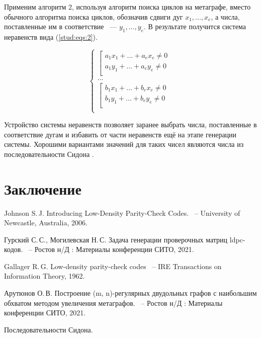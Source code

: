 \documentclass[14pt]{mmcs_article}
\begin{document}
Применим алгоритм 2, используя алгоритм поиска циклов на метаграфе, вместо обычного алгоритма поиска циклов, обозначив сдвиги дуг $x_1, ..., x_e$, а числа, поставленные им в соответствие ~--- $y_1, ..., y_e$. В результате получится система неравенств вида (\ref{stud:eqs:2}).

\begin{equation}
  \left\{
    \begin{array}{ll}
        \left[  
          \begin{array}{ll}
              a_1 x_1 + ... + a_e x_e \neq 0 \\
              a_1 y_1 + ... + a_e y_e \neq 0 \\
          \end{array}
        \right.\\
        ...\\
        \left[  
          \begin{array}{ll}
              b_1 x_1 + ... + b_e x_e \neq 0 \\
              b_1 y_1 + ... + b_e y_e \neq 0 \\
          \end{array}
        \right.\\
    \end{array}
  \right.
  \label{stud:eqs:2}
\end{equation}

Устройство системы неравенств позволяет заранее выбрать числа, поставленные в соответствие дугам и избавить от части неравенств ещё на этапе генерации системы. Хорошими вариантами значений для таких чисел являются числа из последовательности Сидона \cite{sidon}.

\newpage
{}
\section*{Заключение}



\newpage

\renewcommand{\refname}{\centering \textbf{Литература}}

\begin{thebibliography}{0}

Johnson S.\,J.
Introducing Low-Density Parity-Check Codes.
~-- University of Newcastle, Australia, 2006.

Гурский С.\,С., Могилевская Н.\,С.
Задача генерации проверочных матриц ldpc-кодов.
~-- Ростов н/Д : Материалы конференции СИТО, 2021.

Gallager R.\,G. 
Low-density parity-check codes
~-- IRE Transactions on Information Theory, 1962.

Арутюнов О.\,В.
Построение (m, n)-регулярных двудольных графов с наибольшим обхватом методом увеличения метаграфов.
~-- Ростов н/Д : Материалы конференции СИТО, 2021.

Последовательности Сидона.


\end{thebibliography}
\end{document}
